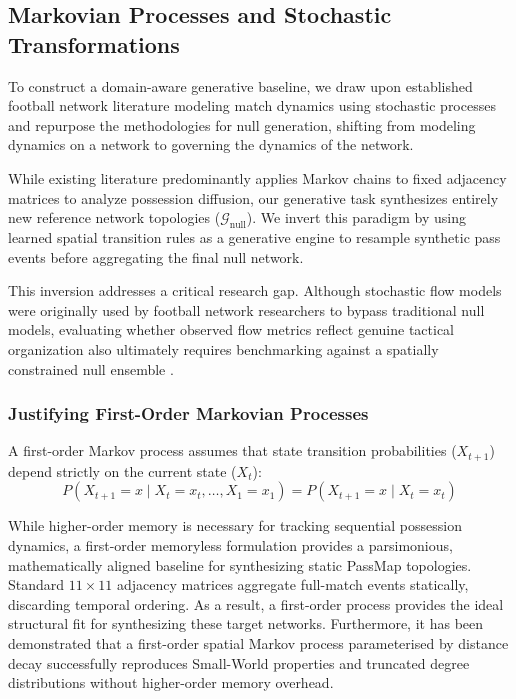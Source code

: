 \documentclass[12pt, a4paper]{article}
\begin{document}
\subsection{Markovian Processes and Stochastic Transformations}
\label{subsec:markovian_processes}

To construct a domain-aware generative baseline, we draw upon established football network literature modeling match dynamics using stochastic processes \cite{narizuka2014statistical, gama2026stoch} and repurpose the methodologies for null generation, shifting from modeling dynamics on a network to governing the dynamics of the network.

While existing literature predominantly applies Markov chains to fixed adjacency matrices to analyze possession diffusion, our generative task synthesizes entirely new reference network topologies ($\mathcal{G}_{\text{null}}$). We invert this paradigm by using learned spatial transition rules as a generative engine to resample synthetic pass events before aggregating the final null network.

This inversion addresses a critical research gap. Although stochastic flow models were originally used by football network researchers to bypass traditional null models, evaluating whether observed flow metrics reflect genuine tactical organization also ultimately requires benchmarking against a spatially constrained null ensemble \cite{gama2026stoch}.

\subsubsection{Justifying First-Order Markovian Processes}
\label{subsubsec:first_order_justification}

A first-order Markov process assumes that state transition probabilities ($X_{t+1}$) depend strictly on the current state ($X_t$):
\begin{equation}
    P(X_{t+1} = x \mid X_t = x_t, \dots, X_1 = x_1) = P(X_{t+1} = x \mid X_t = x_t)
\end{equation}

While higher-order memory is necessary for tracking sequential possession dynamics, a first-order memoryless formulation provides a parsimonious, mathematically aligned baseline for synthesizing static PassMap topologies. Standard $11 \times 11$ adjacency matrices aggregate full-match events statically, discarding temporal ordering. As a result, a first-order process provides the ideal structural fit for synthesizing these target networks. Furthermore, it has been demonstrated \cite{narizuka2014statistical} that a first-order spatial Markov process parameterised by distance decay successfully reproduces Small-World properties and truncated degree distributions without higher-order memory overhead.
\end{document}
